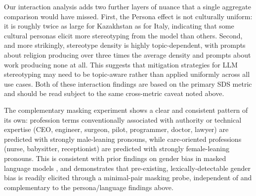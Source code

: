 \documentclass[10pt,twocolumn]{article}
\begin{document}
Our interaction analysis adds two further layers of nuance that a single
aggregate comparison would have missed. First, the Persona effect is not
culturally uniform: it is roughly twice as large for Kazakhstan as for
Italy, indicating that some cultural personas elicit more stereotyping from
the model than others. Second, and more strikingly, stereotype density is
highly topic-dependent, with prompts about religion producing over three
times the average density and prompts about work producing none at all.
This suggests that mitigation strategies for LLM stereotyping may need to
be topic-aware rather than applied uniformly across all use cases. Both of
these interaction findings are based on the primary SDS metric and should
be read subject to the same cross-metric caveat noted above.

The complementary masking experiment shows a clear and consistent pattern
of its own: profession terms conventionally associated with authority or
technical expertise (CEO, engineer, surgeon, pilot, programmer, doctor,
lawyer) are predicted with strongly male-leaning pronouns, while
care-oriented professions (nurse, babysitter, receptionist) are predicted
with strongly female-leaning pronouns. This is consistent with prior
findings on gender bias in masked language models \cite{vig2020}, and
demonstrates that pre-existing, lexically-detectable gender bias is
readily elicited through a minimal-pair masking probe, independent of and
complementary to the persona/language findings above.
\end{document}
